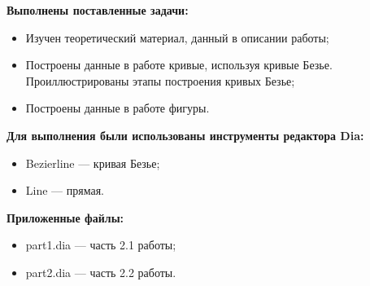 
\textbf{Выполнены поставленные задачи:}
\begin{itemize}
    \item Изучен теоретический материал, данный в описании работы;
    \item Построены данные в работе кривые, используя кривые Безье. Проиллюстрированы этапы построения кривых Безье;
    \item Построены данные в работе фигуры.
\end{itemize}
\hspace{0pt}

\textbf{Для выполнения были использованы инструменты редактора Dia:}
\begin{itemize}
    \item Bezierline --- кривая Безье;
    \item Line --- прямая.
\end{itemize}
\hspace{0pt}

\textbf{Приложенные файлы:}
\begin{itemize}
    \item part1.dia --- часть 2.1 работы;
    \item part2.dia --- часть 2.2 работы.
\end{itemize}


